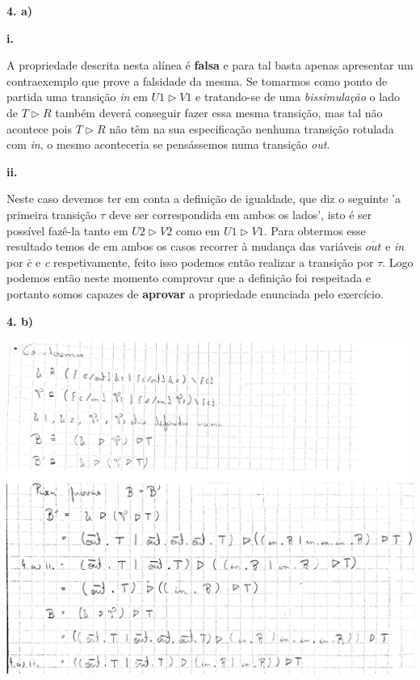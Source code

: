 \documentclass[11pt,a4paper]{report}
\begin{document}
\textbf{4. a)}

\textbf{i.} 

A propriedade descrita nesta alínea é \textbf{falsa} e para tal basta apenas apresentar um contraexemplo que prove a falsidade da mesma. Se tomarmos como ponto de partida uma transição \emph{in} em  \emph{$U1\triangleright V1$} e tratando-se de uma \emph{bissimulação} o lado de \emph{$T\triangleright R$} também deverá conseguir fazer essa mesma transição, mas tal não acontece pois \emph{$T\triangleright R$} não têm na sua especificação nenhuma transição rotulada com \emph{in}, o mesmo aconteceria se pensássemos numa transição \emph{out}.

\textbf{ii.} 

Neste caso devemos ter em conta a definição de igualdade, que diz o seguinte 'a primeira transição $\tau$ deve ser correspondida em ambos os lados', isto é ser possível fazê-la tanto em \emph{$U2\triangleright V2$} como em \emph{$U1\triangleright V1$}. Para obtermos esse resultado temos de em ambos os casos recorrer à mudança das variáveis \emph{$\overline{out}$} e \emph{in} por \emph{$\bar{c}$} e \emph{c} respetivamente, feito isso podemos então realizar a transição por $\tau$. Logo podemos então neste momento comprovar que a definição foi respeitada e portanto somos capazes de \textbf{aprovar} a propriedade enunciada pelo exercício. 

\newpage

\textbf{4. b)}

\begin{minipage}{0.75\linewidth}
        \centering
		\includegraphics[width=\textwidth]{Ex4.jpeg}\par\vspace{1cm}
\end{minipage}
\end{document}
